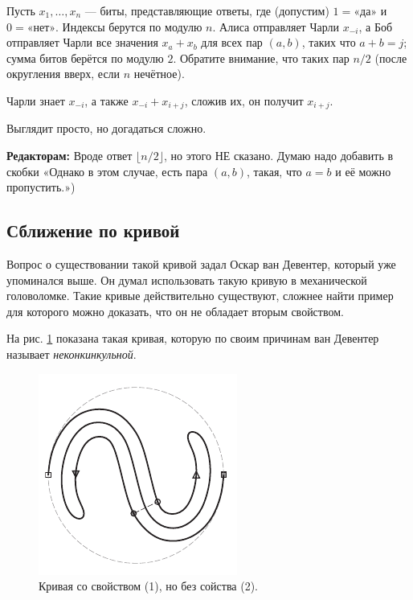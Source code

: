 Пусть $x_1, \dots , x_n$ --- биты, представляющие ответы, где (допустим) $1 = \text{«да»}$ и $0 = \text{«нет»}$.
Индексы берутся по модулю $n$.
Алиса отправляет Чарли $x_{-i}$,
а Боб отправляет Чарли все значения $x_a + x_b$ для всех пар $(a, b)$, таких что $a + b = j$;
сумма битов берётся по модулю $2$.
Обратите внимание, что таких пар $n/2$ (после округления вверх, если $n$ нечётное).

Чарли знает $x_{-i}$, а также $x_{-i} + x_{i+j}$, сложив их, он получит $x_{i+j}$.

Выглядит просто, но догадаться сложно.

\begin{addedbytheeditors}
\textbf{Редакторам:} Вроде ответ $\lfloor n/2\rfloor$, но этого НЕ сказано.
Думаю надо добавить в скобки «Однако в этом случае, есть пара $(a,b)$, такая, что $a=b$ и её можно пропустить.»)
\end{addedbytheeditors}

\subsection*{Сближение по кривой}

Вопрос о существовании такой кривой задал Оскар ван Девентер, который уже упоминался выше.
Он думал использовать такую кривую в механической головоломке.
Такие кривые действительно существуют, сложнее найти пример для которого можно доказать, что он не обладает вторым свойством.

На рис. \ref{pic:ss-curve} показана такая кривая, которую по своим причинам ван Девентер называет \emph{неконкинкульной}.

\begin{figure}[htb!]
\centering
\includegraphics[scale=1]{pics/ss-curve}
\caption{Кривая со свойством (1), но без сойства (2).}
\label{pic:ss-curve}
\end{figure}

